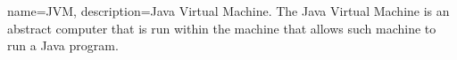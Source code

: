{
    name=JVM,
    description={Java Virtual Machine. The Java Virtual Machine is an abstract computer that is run within the machine that allows such machine to run a Java program.}
}
